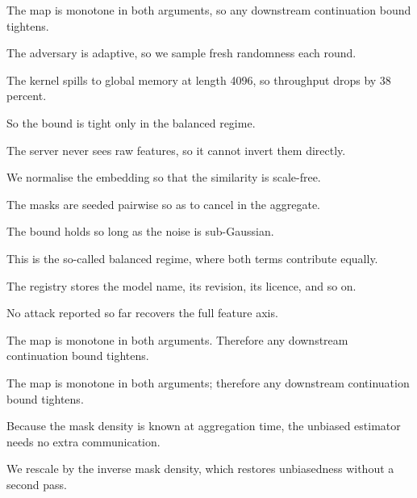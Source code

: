 %

The map is monotone in both arguments, so any downstream continuation bound tightens.

The adversary is adaptive, so we sample fresh randomness each round.

The kernel spills to global memory at length 4096, so throughput drops by 38 percent.

So the bound is tight only in the balanced regime.

The server never sees raw features, so it cannot invert them directly.

We normalise the embedding so that the similarity is scale-free.

The masks are seeded pairwise so as to cancel in the aggregate.

The bound holds so long as the noise is sub-Gaussian.

This is the so-called balanced regime, where both terms contribute equally.

The registry stores the model name, its revision, its licence, and so on.

No attack reported so far recovers the full feature axis.

The map is monotone in both arguments. Therefore any downstream continuation bound tightens.

The map is monotone in both arguments; therefore any downstream continuation bound tightens.

Because the mask density is known at aggregation time, the unbiased estimator needs no extra communication.

We rescale by the inverse mask density, which restores unbiasedness without a second pass.
